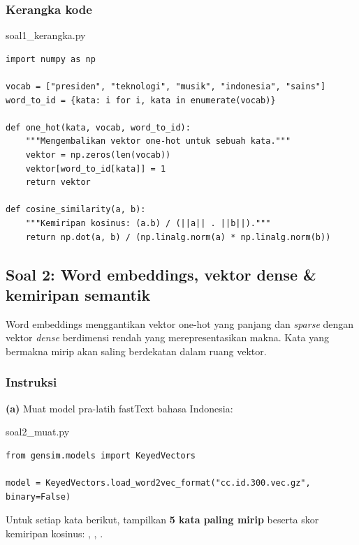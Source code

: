 \documentclass[12pt, a4paper]{article}
\begin{document}
\subsubsection{Kerangka kode}
\label{sec:soal1-kode}

\begin{codewindow}{soal1\_kerangka.py}
\begin{lstlisting}[style=pycode]
import numpy as np

vocab = ["presiden", "teknologi", "musik", "indonesia", "sains"]
word_to_id = {kata: i for i, kata in enumerate(vocab)}

def one_hot(kata, vocab, word_to_id):
    """Mengembalikan vektor one-hot untuk sebuah kata."""
    vektor = np.zeros(len(vocab))
    vektor[word_to_id[kata]] = 1
    return vektor

def cosine_similarity(a, b):
    """Kemiripan kosinus: (a.b) / (||a|| . ||b||)."""
    return np.dot(a, b) / (np.linalg.norm(a) * np.linalg.norm(b))
\end{lstlisting}
\end{codewindow}

\clearpage
\subsection{Soal 2: Word embeddings, vektor dense \& kemiripan semantik}
\label{sec:soal2}

Word embeddings menggantikan vektor one-hot yang panjang dan \emph{sparse} dengan vektor \emph{dense} berdimensi rendah yang merepresentasikan makna. Kata yang bermakna mirip akan saling berdekatan dalam ruang vektor.

\subsubsection{Instruksi}
\label{sec:soal2-instruksi}

\textbf{(a)} Muat model pra-latih fastText bahasa Indonesia:

\begin{codewindow}{soal2\_muat.py}
\begin{lstlisting}[style=pycode]
from gensim.models import KeyedVectors

model = KeyedVectors.load_word2vec_format("cc.id.300.vec.gz", binary=False)
\end{lstlisting}
\end{codewindow}

Untuk setiap kata berikut, tampilkan \textbf{5 kata paling mirip} beserta skor kemiripan kosinus: , , .
\end{document}
